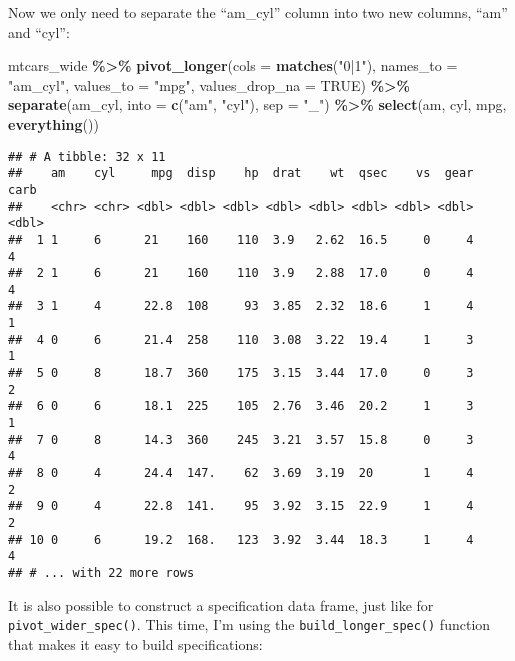 \documentclass[
]{article}
\newenvironment{Shaded}{\begin{snugshade}}{\end{snugshade}}
\newcommand{\DataTypeTok}[1]{\textcolor[rgb]{0.13,0.29,0.53}{#1}}
\newcommand{\KeywordTok}[1]{\textcolor[rgb]{0.13,0.29,0.53}{\textbf{#1}}}
\newcommand{\NormalTok}[1]{#1}
\newcommand{\OperatorTok}[1]{\textcolor[rgb]{0.81,0.36,0.00}{\textbf{#1}}}
\newcommand{\OtherTok}[1]{\textcolor[rgb]{0.56,0.35,0.01}{#1}}
\newcommand{\StringTok}[1]{\textcolor[rgb]{0.31,0.60,0.02}{#1}}
\begin{document}
Now we only need to separate the ``am\_cyl'' column into two new columns, ``am'' and ``cyl'':

\begin{Shaded}
\begin{Highlighting}[]
\NormalTok{mtcars\_wide }\OperatorTok{\%\textgreater{}\%}\StringTok{ }
\StringTok{  }\KeywordTok{pivot\_longer}\NormalTok{(}\DataTypeTok{cols =} \KeywordTok{matches}\NormalTok{(}\StringTok{"0|1"}\NormalTok{), }\DataTypeTok{names\_to =} \StringTok{"am\_cyl"}\NormalTok{, }\DataTypeTok{values\_to =} \StringTok{"mpg"}\NormalTok{, }\DataTypeTok{values\_drop\_na =} \OtherTok{TRUE}\NormalTok{) }\OperatorTok{\%\textgreater{}\%}\StringTok{ }
\StringTok{  }\KeywordTok{separate}\NormalTok{(am\_cyl, }\DataTypeTok{into =} \KeywordTok{c}\NormalTok{(}\StringTok{"am"}\NormalTok{, }\StringTok{"cyl"}\NormalTok{), }\DataTypeTok{sep =} \StringTok{"\_"}\NormalTok{) }\OperatorTok{\%\textgreater{}\%}\StringTok{ }
\StringTok{  }\KeywordTok{select}\NormalTok{(am, cyl, mpg, }\KeywordTok{everything}\NormalTok{())}
\end{Highlighting}
\end{Shaded}

\begin{verbatim}
## # A tibble: 32 x 11
##    am    cyl     mpg  disp    hp  drat    wt  qsec    vs  gear  carb
##    <chr> <chr> <dbl> <dbl> <dbl> <dbl> <dbl> <dbl> <dbl> <dbl> <dbl>
##  1 1     6      21    160    110  3.9   2.62  16.5     0     4     4
##  2 1     6      21    160    110  3.9   2.88  17.0     0     4     4
##  3 1     4      22.8  108     93  3.85  2.32  18.6     1     4     1
##  4 0     6      21.4  258    110  3.08  3.22  19.4     1     3     1
##  5 0     8      18.7  360    175  3.15  3.44  17.0     0     3     2
##  6 0     6      18.1  225    105  2.76  3.46  20.2     1     3     1
##  7 0     8      14.3  360    245  3.21  3.57  15.8     0     3     4
##  8 0     4      24.4  147.    62  3.69  3.19  20       1     4     2
##  9 0     4      22.8  141.    95  3.92  3.15  22.9     1     4     2
## 10 0     6      19.2  168.   123  3.92  3.44  18.3     1     4     4
## # ... with 22 more rows
\end{verbatim}

It is also possible to construct a specification data frame, just like for \texttt{pivot\_wider\_spec()}.
This time, I'm using the \texttt{build\_longer\_spec()} function that makes it easy to build specifications:
\end{document}
